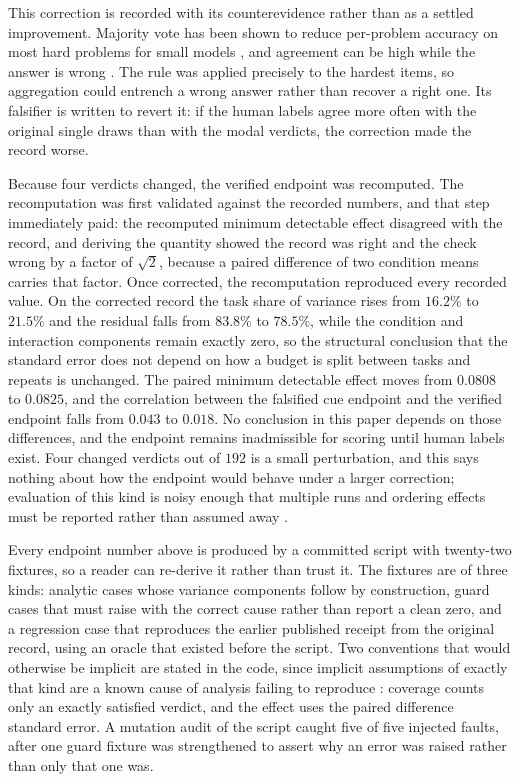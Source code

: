 \documentclass[11pt,a4paper]{article}
\begin{document}
This correction is recorded with its counterevidence rather than as a settled
improvement. Majority vote has been shown to reduce per-problem accuracy on most hard
problems for small models \citep{majorityhurts2026}, and agreement can be high while the
answer is wrong \citep{wrongconsensus2026}. The rule was applied precisely to the hardest
items, so aggregation could entrench a wrong answer rather than recover a right one. Its
falsifier is written to revert it: if the human labels agree more often with the original
single draws than with the modal verdicts, the correction made the record worse.

Because four verdicts changed, the verified endpoint was recomputed. The recomputation
was first validated against the recorded numbers, and that step immediately paid: the
recomputed minimum detectable effect disagreed with the record, and deriving the quantity
showed the record was right and the check wrong by a factor of $\sqrt{2}$, because a
paired difference of two condition means carries that factor. Once corrected, the
recomputation reproduced every recorded value. On the corrected record the task share of
variance rises from $16.2\%$ to $21.5\%$ and the residual falls from $83.8\%$ to
$78.5\%$, while the condition and interaction components remain exactly zero, so the
structural conclusion that the standard error does not depend on how a budget is split
between tasks and repeats is unchanged. The paired minimum detectable effect moves from
$0.0808$ to $0.0825$, and the correlation between the falsified cue endpoint and the
verified endpoint falls from $0.043$ to $0.018$. No conclusion in this paper depends on
those differences, and the endpoint remains inadmissible for scoring until human labels
exist. Four changed verdicts out of $192$ is a small perturbation, and this says nothing
about how the endpoint would behave under a larger correction; evaluation of this kind is
noisy enough that multiple runs and ordering effects must be reported rather than assumed
away \citep{multiplerunsorder2026}.

Every endpoint number above is produced by a committed script with twenty-two fixtures,
so a reader can re-derive it rather than trust it. The fixtures are of three kinds:
analytic cases whose variance components follow by construction, guard cases that must
raise with the correct cause rather than report a clean zero, and a regression case that
reproduces the earlier published receipt from the original record, using an oracle that
existed before the script. Two conventions that would otherwise be implicit are stated in
the code, since implicit assumptions of exactly that kind are a known cause of analysis
failing to reproduce \citep{implicitassumptions2026}: coverage counts only an exactly
satisfied verdict, and the effect uses the paired difference standard error. A mutation
audit of the script caught five of five injected faults, after one guard fixture was
strengthened to assert why an error was raised rather than only that one was.
\end{document}
